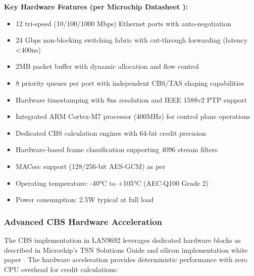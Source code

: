 \documentclass[10pt, journal, compsoc]{IEEEtran}
\begin{document}
\textbf{Key Hardware Features (per Microchip Datasheet \cite{microchip2024lan9692}):}
\begin{itemize}
    \item 12 tri-speed (10/100/1000 Mbps) Ethernet ports with auto-negotiation
    \item 24 Gbps non-blocking switching fabric with cut-through forwarding (latency <400ns)
    \item 2MB packet buffer with dynamic allocation and flow control
    \item 8 priority queues per port with independent CBS/TAS shaping capabilities
    \item Hardware timestamping with 8ns resolution and IEEE 1588v2 PTP support
    \item Integrated ARM Cortex-M7 processor (400MHz) for control plane operations
    \item Dedicated CBS calculation engines with 64-bit credit precision
    \item Hardware-based frame classification supporting 4096 stream filters
    \item MACsec support (128/256-bit AES-GCM) as per \cite{microchip2024security}
    \item Operating temperature: -40°C to +105°C (AEC-Q100 Grade 2)
    \item Power consumption: 2.5W typical at full load \cite{microchip2024power}
\end{itemize}

\subsubsection{Advanced CBS Hardware Acceleration}

The CBS implementation in LAN9692 leverages dedicated hardware blocks as described in Microchip's TSN Solutions Guide \cite{microchip2023tsn_guide} and silicon implementation white paper \cite{microchip2024silicon}. The hardware acceleration provides deterministic performance with zero CPU overhead for credit calculations:
\end{document}
